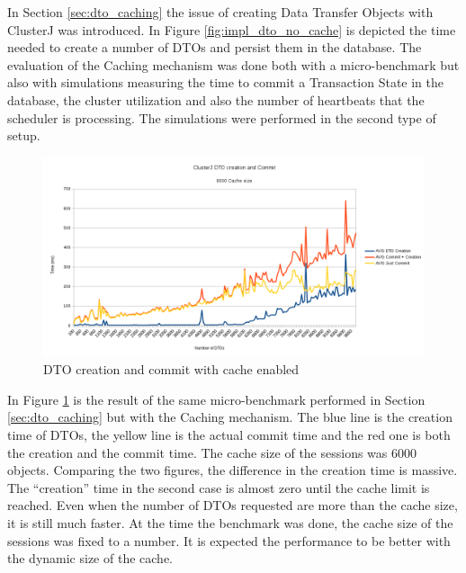 In Section \ref{sec:dto_caching} the issue of
creating Data Transfer Objects with ClusterJ was introduced. In Figure
\ref{fig:impl_dto_no_cache} is depicted the time needed to create a number of
DTOs and persist them in the database. The evaluation of the Caching
mechanism was done both with a micro-benchmark but also with simulations
measuring the time to commit a Transaction State in the database,
the cluster utilization and also the number of heartbeats that the
scheduler is processing. The simulations were performed in the second
type of setup.

\begin{figure}
\centering
\includegraphics[scale=0.5]{resources/images/Evaluation/dto_creation_cache_bench.png}
\caption{DTO creation and commit with cache enabled}
\label{fig:ev_dto_creation_bench}
\end{figure}

In Figure \ref{fig:ev_dto_creation_bench} is the result of the same
micro-benchmark performed in Section \ref{sec:dto_caching} but with
the Caching mechanism. The blue line is the creation time of DTOs, the
yellow line is the actual commit time and the red one is both the
creation and the commit time. The cache size of the sessions was 6000
objects. Comparing the two figures, the difference in the creation
time is massive. The ``creation'' time in the second case is almost
zero until the cache limit is reached. Even when the number of DTOs
requested are more than the cache size, it is still much faster. At
the time the benchmark was done, the cache size of the sessions was
fixed to a number. It is expected the performance to be better with the
dynamic size of the cache.

